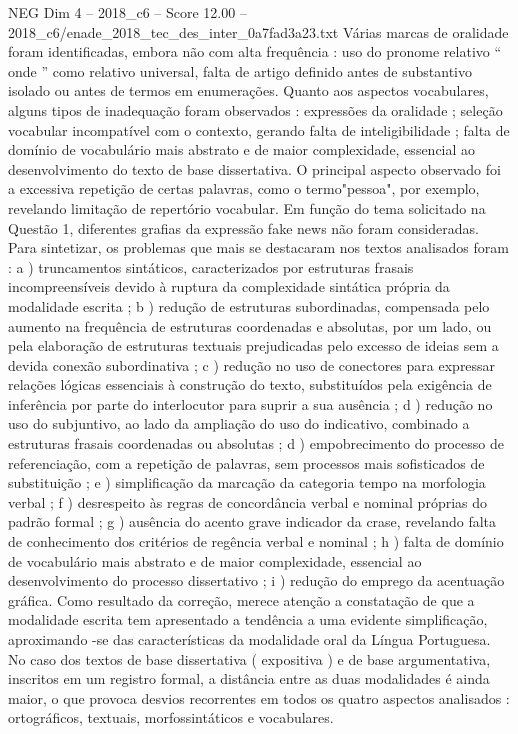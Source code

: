 \begin{textsample}{NEG Dim 4 – 2018\_c6 – Score 12.00 – 2018\_c6/enade\_2018\_tec\_des\_inter\_0a7fad3a23.txt}
Várias marcas de oralidade foram identificadas, embora não com alta frequência : uso do pronome relativo “ onde ” como relativo universal, falta de artigo definido antes de substantivo isolado ou antes de termos em enumerações.
Quanto aos aspectos vocabulares, alguns tipos de inadequação foram observados : expressões da oralidade ; seleção vocabular incompatível com o contexto, gerando falta de inteligibilidade ; falta de domínio de vocabulário mais abstrato e de maior complexidade, essencial ao desenvolvimento do texto de base dissertativa.
O principal aspecto observado foi a excessiva repetição de certas palavras, como o termo"pessoa", por exemplo, revelando limitação de repertório vocabular.
Em função do tema solicitado na Questão 1, diferentes grafias da expressão fake news não foram consideradas.
Para sintetizar, os problemas que mais se destacaram nos textos analisados foram : a ) truncamentos sintáticos, caracterizados por estruturas frasais incompreensíveis devido à ruptura da complexidade sintática própria da modalidade escrita ; b ) redução de estruturas subordinadas, compensada pelo aumento na frequência de estruturas coordenadas e absolutas, por um lado, ou pela elaboração de estruturas textuais prejudicadas pelo excesso de ideias sem a devida conexão subordinativa ; c ) redução no uso de conectores para expressar relações lógicas essenciais à construção do texto, substituídos pela exigência de inferência por parte do interlocutor para suprir a sua ausência ; d ) redução no uso do subjuntivo, ao lado da ampliação do uso do indicativo, combinado a estruturas frasais coordenadas ou absolutas ; d ) empobrecimento do processo de referenciação, com a repetição de palavras, sem processos mais sofisticados de substituição ; e ) simplificação da marcação da categoria tempo na morfologia verbal ; f ) desrespeito às regras de concordância verbal e nominal próprias do padrão formal ; g ) ausência do acento grave indicador da crase, revelando falta de conhecimento dos critérios de regência verbal e nominal ; h ) falta de domínio de vocabulário mais abstrato e de maior complexidade, essencial ao desenvolvimento do processo dissertativo ; i ) redução do emprego da acentuação gráfica.
Como resultado da correção, merece atenção a constatação de que a modalidade escrita tem apresentado a tendência a uma evidente simplificação, aproximando -se das características da modalidade oral da Língua Portuguesa.
No caso dos textos de base dissertativa ( expositiva ) e de base argumentativa, inscritos em um registro formal, a distância entre as duas modalidades é ainda maior, o que provoca desvios recorrentes em todos os quatro aspectos analisados : ortográficos, textuais, morfossintáticos e vocabulares.

\end{textsample}
